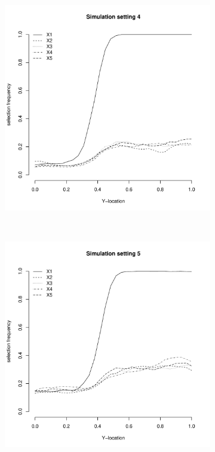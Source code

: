\documentclass[authoryear, review, 11pt]{elsarticle}
\begin{document}
	
	\begin{figure}
		\centering
		\begin{subfigure}[b]{0.3\textwidth}
			\centering
			\includegraphics[width=\textwidth]{../../figures/simulation/28-4-profile-selection.pdf}
			\label{fig:gull}
		\end{subfigure}%
        ~ %
		\begin{subfigure}[b]{0.3\textwidth}
			\centering
			\includegraphics[width=\textwidth]{../../figures/simulation/28-5-profile-selection.pdf}

\end{subfigure}
\end{figure}
\end{document}
